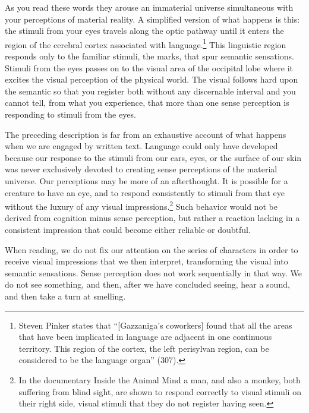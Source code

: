 \documentclass[
]{memoir}
\begin{document}
As you read these words they arouse an immaterial universe simultaneous
with your perceptions of material reality. A simplified version of what
happens is this: the stimuli from your eyes travels along the optic
pathway until it enters the region of the cerebral cortex associated
with language.\footnote{Steven Pinker states that ``{[}Gazzaniga's
  coworkers{]} found that all the areas that have been implicated in
  language are adjacent in one continuous territory. This region of the
  cortex, the left perisylvan region, can be considered to be the
  language organ'' (307).} This linguistic region responds only to the
familiar stimuli, the marks, that spur semantic sensations. Stimuli from
the eyes passes on to the visual area of the occipital lobe where it
excites the visual perception of the physical world. The visual follows
hard upon the semantic so that you register both without any discernable
interval and you cannot tell, from what you experience, that more than
one sense perception is responding to stimuli from the eyes.

The preceding description is far from an exhaustive account of what
happens when we are engaged by written text. Language could only have
developed because our response to the stimuli from our ears, eyes, or
the surface of our skin was never exclusively devoted to creating sense
perceptions of the material universe. Our perceptions may be more of an
afterthought. It is possible for a creature to have an eye, and to
respond consistently to stimuli from that eye without the luxury of any
visual impressions.\footnote{In the documentary Inside the Animal Mind a
  man, and also a monkey, both suffering from blind sight, are shown to
  respond correctly to visual stimuli on their right side, visual
  stimuli that they do not register having seen.} Such behavior would
not be derived from cognition minus sense perception, but rather a
reaction lacking in a consistent impression that could become either
reliable or doubtful.

When reading, we do not fix our attention on the series of characters in
order to receive visual impressions that we then interpret, transforming
the visual into semantic sensations. Sense perception does not work
sequentially in that way. We do not see something, and then, after we
have concluded seeing, hear a sound, and then take a turn at smelling.
\end{document}
